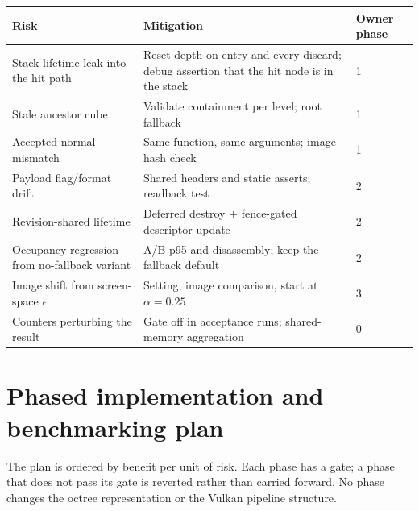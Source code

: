 \documentclass[11pt,a4paper]{article}
\theoremstyle{plain}
\theoremstyle{definition}
\theoremstyle{remark}
\begin{document}
\begin{center}
\small
\begin{tabularx}{\linewidth}{@{}lXl@{}}
\toprule
Risk & Mitigation & Owner phase \\
\midrule
Stack lifetime leak into the hit path & Reset depth on entry and every discard;
  debug assertion that the hit node is in the stack & 1 \\
Stale ancestor cube & Validate containment per level; root fallback & 1 \\
Accepted normal mismatch & Same function, same arguments; image hash check & 1 \\
Payload flag/format drift & Shared headers and static asserts; readback test & 2 \\
Revision-shared lifetime & Deferred destroy + fence-gated descriptor update & 2 \\
Occupancy regression from no-fallback variant & A/B p95 and disassembly;
  keep the fallback default & 2 \\
Image shift from screen-space $\epsilon$ & Setting, image comparison, start at
  $\alpha=0.25$ & 3 \\
Counters perturbing the result & Gate off in acceptance runs; shared-memory
  aggregation & 0 \\
\bottomrule
\end{tabularx}
\end{center}

\section{Phased implementation and benchmarking plan}
\label{sec:plan}

The plan is ordered by benefit per unit of risk. Each phase has a gate; a phase
that does not pass its gate is reverted rather than carried forward. No phase
changes the octree representation or the Vulkan pipeline structure.
\end{document}
